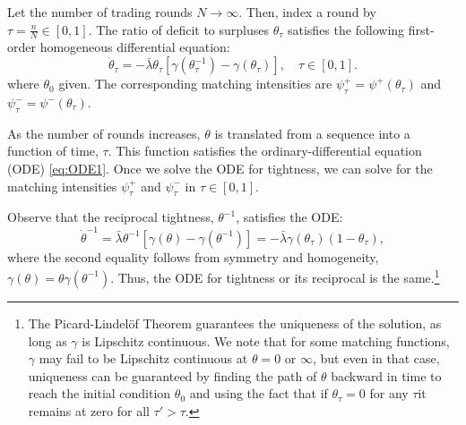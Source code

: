 \documentclass[12pt,american,english,notitlepage]{article}
\begin{document}
\begin{lemma} \label{P_ContinuousProbabilities}
Let the number of trading rounds $N\rightarrow\infty$. Then, index a round by $\tau=\frac{n}{N}\in\left[0,1\right].$ The ratio of deficit to surpluses $\theta_{\tau}$
satisfies the following first-order homogeneous differential equation:
\begin{equation}
\dot{\theta}_{\tau}=-\bar{\lambda}\theta_{\tau}\left[\gamma\left(\theta_{\tau}^{-1}\right)-\gamma\left(\theta_{\tau}\right)\right],\quad\tau\in\left[0,1\right].\label{eq:ODE1}
\end{equation}
where $\theta_{0}$ given. The corresponding matching intensities
are $\psi_{\tau}^{+}=\psi^{+}\left(\theta_{\tau}\right)$ and $\psi_{\tau}^{-}=\psi^{-}\left(\theta_{\tau}\right)$.

\end{lemma}

As the number of rounds increases, $\theta$ is translated from a
sequence into a function of time, $\tau$. This function satisfies
the ordinary-differential equation (ODE) \eqref{eq:ODE1}. Once
we solve the ODE for tightness, we can solve for the matching intensities
$\psi_{\tau}^{+}$ and $\psi_{\tau}^{-}$ in $\tau\in\left[0,1\right]$.

Observe that the reciprocal tightness, $\theta^{-1}$, satisfies the
ODE:
\begin{equation}
\label{eq:canonical.ode}
\dot{\theta}^{-1}=\bar{\lambda}\theta^{-1}\left[\gamma\left(\theta\right)-\gamma\left(\theta^{-1}\right)\right]=-\bar{\lambda}\gamma\left(\theta_{\tau}\right)\left(1-\theta_{\tau}\right),
\end{equation}
where the second equality follows from symmetry and homogeneity, $\gamma\left(\theta\right)=\theta\gamma\left(\theta^{-1}\right)$.
Thus, the ODE for tightness or its reciprocal is the same.\footnote{The Picard-Lindel\"of Theorem guarantees the uniqueness
of the solution, as long as $\gamma$ is Lipschitz continuous. We
note that for some matching functions, $\gamma$ may fail to be Lipschitz
continuous at $\theta=0$ or $\infty$, but even in that case, uniqueness
can be guaranteed by finding the path of $\theta$ backward in time
to reach the initial condition $\theta_{0}$ and using the fact that
if $\theta_{\tau}=0$ for any $\tau$it remains at zero for all $\tau'>\tau$.}
\end{document}
